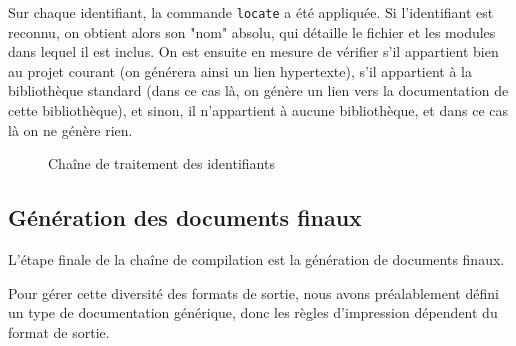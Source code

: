 \documentclass[a4paper, 11pt]{report}
\begin{document}
    Sur chaque identifiant, la commande \texttt{locate} a été appliquée. Si
    l'identifiant est reconnu, on obtient alors son "nom" absolu, qui détaille
    le fichier et les modules dans lequel il est inclus.
    On est ensuite en mesure de vérifier s'il appartient bien au projet courant
    (on générera ainsi un lien hypertexte), s'il appartient à la bibliothèque
    standard (dans ce cas là, on génère un lien vers la documentation de
    cette bibliothèque), et sinon, il n'appartient à aucune bibliothèque,
    et dans ce cas là on ne génère rien.
    \begin{figure}
      \caption{Chaîne de traitement des identifiants\label{id1}}
    \end{figure}
    \clearpage

    \subsection{Génération des documents finaux}
    L'étape finale de la chaîne de compilation est la génération de documents
    finaux.

    Pour gérer cette diversité des formats de sortie, nous avons préalablement
    défini un type de documentation générique, donc les règles d'impression
    dépendent du format de sortie.
\end{document}
